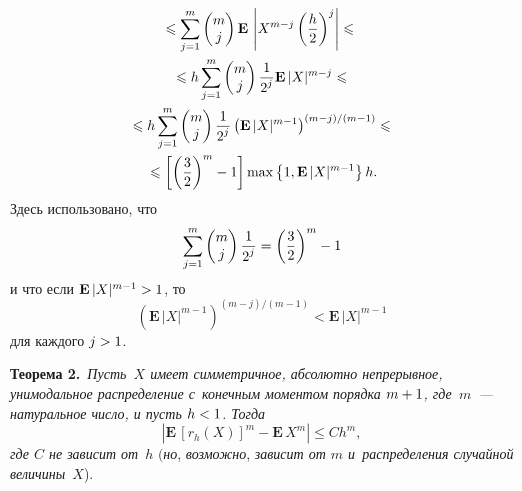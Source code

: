 \begin{multicols}{2}

\noindent
\begin{multline*}
\leqslant
\sum\limits_{j=1}^m \begin{pmatrix}
m\\ j
\end{pmatrix}
\mathbf{E}\,\left|X^{m-j}\left(\frac{h}{2}\right)^j\right|
\leqslant{}\\
{}\leqslant
h\sum\limits_{j=1}^m
\begin{pmatrix}
m\\ j
\end{pmatrix}
\displaystyle\frac{\displaystyle 1\mathstrut}{\displaystyle 2^j\mathstrut}\mathbf{E}\,|X|^{m-j}
\leqslant{}\\
{}\leqslant
h\sum\limits_{j=1}^m
\begin{pmatrix}
m\\ j
\end{pmatrix}
\displaystyle\frac{\displaystyle 1\mathstrut}{\displaystyle 2^j\mathstrut}\left(\mathbf{E}\,|X|^{m-1}\right)^{(m-j)/(m-1)}
\leqslant{}\\
{}\leqslant
\left[\left(\displaystyle\frac{\displaystyle 3\mathstrut}{\displaystyle 2\mathstrut}\right)^m-1\right]\max\left\{1,\mathbf{E}\,|X|^{m-1}\right\}h.
\end{multline*}
Здесь использовано, что
$$
\sum\limits_{j=1}^m
\begin{pmatrix}
m\\ j
\end{pmatrix}
\displaystyle\frac{\displaystyle 1\mathstrut}{\displaystyle 2^j\mathstrut}=\left(\displaystyle\frac{\displaystyle 3\mathstrut}{\displaystyle 2\mathstrut}\right)^m-1
$$
и что если $\mathbf{E}\,|X|^{m-1}\hm>1$, то
$$
\left(\mathbf{E}\,|X|^{m-1}\right)^{(m-j)/(m-1)}<\mathbf{E}\,|X|^{m-1}
$$
для каждого $j\hm>1$.

\smallskip

\noindent
\textbf{Теорема 2.}\ \textit{Пусть~$X$ имеет симметричное, абсолютно непрерывное, унимодальное распределение
с~конечным моментом порядка $m\hm+1$, где~$m$~--- натуральное число,
и пусть $h\hm<1$. Тогда}
$$
\left\vert \mathbf{E}\,\left[r_h(X)\right]^m-\mathbf{E}\, X^m \right\vert \leqslant
Ch^m,
$$
\textit{где $C$ не зависит от}~$h$ $($\textit{но}, \textit{возможно}, \textit{зависит от $m$ и~распределения случайной величины~$X$}).

\begin{table*}\small %
\begin{center}
\vspace*{2ex}


\end{center}
\end{table*}
\end{multicols}
